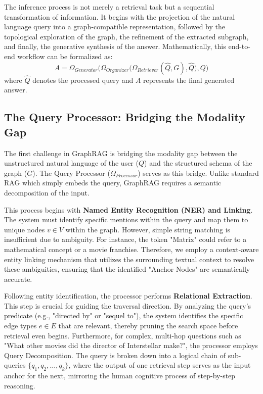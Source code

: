 \documentclass[a4paper, 12pt]{extreport}
\begin{document}
The inference process is not merely a retrieval task but a sequential transformation of information. It begins with the projection of the natural language query into a graph-compatible representation, followed by the topological exploration of the graph, the refinement of the extracted subgraph, and finally, the generative synthesis of the answer. Mathematically, this end-to-end workflow can be formalized as:
\begin{equation}
    A = \Omega_{Generator}\Big(\Omega_{Organizer}\big(\Omega_{Retriever}(\hat{Q}, G), \hat{Q}\big), Q\Big)
\end{equation}
where $\hat{Q}$ denotes the processed query and $A$ represents the final generated answer.


\subsection{The Query Processor: Bridging the Modality Gap}
The first challenge in GraphRAG \cite{han2025retrievalaugmentedgenerationgraphsgraphrag} is bridging the modality gap between the unstructured natural language of the user ($Q$) and the structured schema of the graph ($G$). The Query Processor ($\Omega_{Processor}$) serves as this bridge. Unlike standard RAG which simply embeds the query, GraphRAG requires a semantic decomposition of the input.

This process begins with \textbf{Named Entity Recognition (NER) and Linking}. The system must identify specific mentions within the query and map them to unique nodes $v \in V$ within the graph. However, simple string matching is insufficient due to ambiguity. For instance, the token "Matrix" could refer to a mathematical concept or a movie franchise. Therefore, we employ a context-aware entity linking mechanism that utilizes the surrounding textual context to resolve these ambiguities, ensuring that the identified "Anchor Nodes" are semantically accurate.

Following entity identification, the processor performs \textbf{Relational Extraction}. This step is crucial for guiding the traversal direction. By analyzing the query's predicate (e.g., "directed by" or "sequel to"), the system identifies the specific edge types $e \in E$ that are relevant, thereby pruning the search space before retrieval even begins. Furthermore, for complex, multi-hop questions such as "What other movies did the director of Interstellar make?", the processor employs Query Decomposition\cite{touvron2023llama}. The query is broken down into a logical chain of sub-queries $\{q_1, q_2, \dots, q_k\}$, where the output of one retrieval step serves as the input anchor for the next, mirroring the human cognitive process of step-by-step reasoning.
\end{document}
